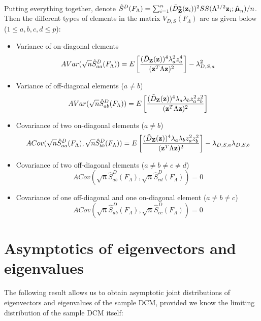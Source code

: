 \paragraph{}Putting everything together, denote $\hat S^D(F_\Lambda) = \sum_{i=1}^n (\tilde D^n_{\mathbf{Z}} ({\bf{z}}_i))^2 SS(\Lambda^{1/2}{\bf{z}}_i; \hat {{\boldsymbol{\mu}}}_n)/n $. Then the different types of elements in the matrix $V_{D,S}(F_\Lambda)$ are as given below ($1 \leq a,b,c,d \leq p$):

\begin{itemize}
\item Variance of on-diagonal elements
%
$$ AVar( \sqrt n \hat S^D_{aa} (F_\Lambda)) = E \left[ \frac{(\tilde D_{\mathbf{Z}} ({\bf{z}}))^4 \lambda_a^2 z_a^4}{({\bf{z}}^T \Lambda {\bf{z}})^2} \right] - \lambda_{D,S,a}^2 $$

\item Variance of off-diagonal elements ($a \neq b$)
%
$$ AVar( \sqrt n \hat S^D_{ab} (F_\Lambda)) = E \left[ \frac{(\tilde D_{\mathbf{Z}} ({\bf{z}}))^4 \lambda_a \lambda_b z_a^2 z_b^2}{({\bf{z}}^T \Lambda {\bf{z}})^2} \right] $$

\item Covariance of two on-diagonal elements ($a \neq b$)
%
$$ ACov(\sqrt n \hat S^D_{aa} (F_\Lambda), \sqrt n \hat S^D_{bb} (F_\Lambda))
= E \left[ \frac{(\tilde D_{\mathbf{Z}} ({\bf{z}}))^4 \lambda_a \lambda_b z_a^2 z_b^2}{({\bf{z}}^T \Lambda {\bf{z}})^2} \right] - \lambda_{D,S,a} \lambda_{D,S,b} $$

\item Covariance of two off-diagonal elements ($a \neq b \neq c \neq d$)
%
$$ ACov(\sqrt n \hat S^D_{ab} (F_\Lambda), \sqrt n \hat S^D_{cd} (F_\Lambda)) = 0 $$

\item Covariance of one off-diagonal and one on-diagonal element ($a \neq b \neq c$)
%
$$ ACov(\sqrt n \hat S^D_{ab} (F_\Lambda), \sqrt n \hat S^D_{cc} (F_\Lambda)) = 0 $$
\end{itemize}

\section{Asymptotics of eigenvectors and eigenvalues}\label{section:appB}
The following result allows us to obtain asymptotic joint distributions of eigenvectors and eigenvalues of the sample DCM, provided we know the limiting distribution of the sample DCM itself:

